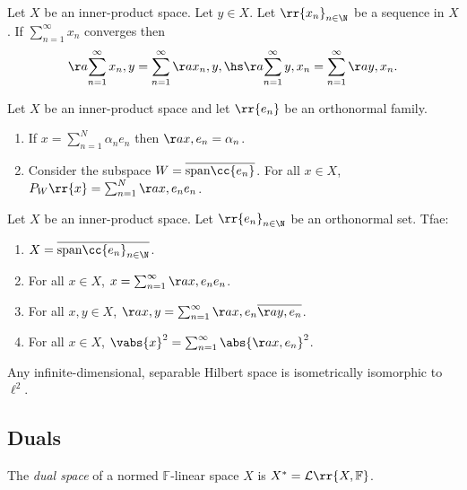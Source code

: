 \documentclass{article}
\begin{document}
\begin{lemma}
  Let $X$ be an inner-product space. Let $y\in X$. Let $\rr{x_n}_{n\in\N}$ be a sequence
  in $X$. If $\sum_{n=1}^{\infty} x_n$ converges then
  \begin{align*}
    \aa{\sum_{n=1}^{\infty} x_n,y}=\sum_{n=1}^{\infty} \aa{x_n,y}, \hs
    \aa{\sum_{n=1}^{\infty} y,x_n}=\sum_{n=1}^{\infty} \aa{y,x_n}.
  \end{align*}
\end{lemma}

\begin{theorem}
  Let $X$ be an inner-product space and let $\rr{e_n}$ be an orthonormal
  family.
  \begin{enumerate}
    \item If $x=\sum_{n=1}^{N} \alpha_n e_n$ then $\aa{x,e_n}=\alpha_n$.
    \item Consider the subspace $W=\overline{\text{span}\cc{e_n}}$. For all
      $x\in X$, $P_{W}\rr{x}=\sum_{n=1}^{N} \aa{x,e_n}e_n$.
  \end{enumerate}
\end{theorem}

\begin{theorem}
  Let $X$ be an inner-product space. Let $\rr{e_n}_{n\in\N}$ be an orthonormal
  set. Tfae:
  \begin{enumerate}
    \item $X=\overline{\text{span}\cc{e_n}_{n\in\N}}$.
    \item For all $x\in X$, $x=\sum_{n=1}^{\infty} \aa{x,e_n}e_n$.
    \item For all $x,y\in X$, $\aa{x,y}=\sum_{n=1}^{\infty} \aa{x,e_n}\overline{\aa{y,e_n}}$.
    \item For all $x\in X$, $\vabs{x}^2 = \sum_{n=1}^{\infty} \abs{\aa{x,e_n}}^2$.
  \end{enumerate}
\end{theorem}

\begin{corollary}
  Any infinite-dimensional, separable Hilbert space is isometrically isomorphic
  to $\ell^2$.
\end{corollary}

\subsection{Duals}

\begin{definition}
  The \emph{dual space} of a normed $\mathbb F$-linear space $X$ is $X^* =
  \mathcal L\rr{X,\mathbb F}$.
\end{definition}
\end{document}
